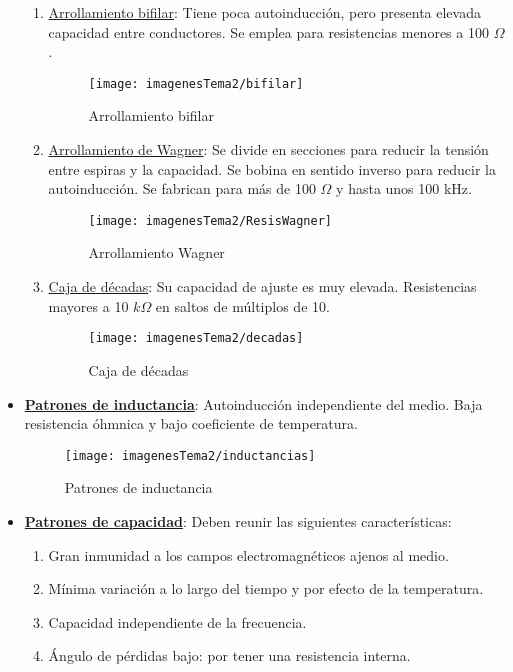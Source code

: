\begin{itemize}
	\begin{enumerate}
		\item \underline{Arrollamiento bifilar}: Tiene poca autoinducción, pero presenta elevada capacidad entre conductores. Se emplea para resistencias menores a 100 $\Omega$.
		
		\begin{figure}[H]
			\centering
			\texttt{[image: imagenesTema2/bifilar]}
			\caption{Arrollamiento bifilar}
			\label{fig:bifilar}
		\end{figure}
		
		\item \underline{Arrollamiento de Wagner}: Se divide en secciones para reducir la tensión entre espiras y la capacidad. Se bobina en sentido inverso para reducir la autoinducción. Se fabrican para más de 100 $\Omega$ y hasta unos 100 kHz.
		
		\begin{figure}[H]
			\centering
			\texttt{[image: imagenesTema2/ResisWagner]}
			\caption{Arrollamiento Wagner}
			\label{fig:resiswagner}
		\end{figure}
		
		\item \underline{Caja de décadas}: Su capacidad de ajuste es muy elevada. Resistencias mayores a 10 $k\Omega$ en saltos de múltiplos de 10.
		\begin{figure}[H]
			\centering
			\texttt{[image: imagenesTema2/decadas]}
			\caption{Caja de décadas}
			\label{fig:decadas}
		\end{figure}
		
		
	\end{enumerate}
	
	\item \underline{\textbf{Patrones de inductancia}}: Autoinducción independiente del medio. Baja resistencia óhmnica  y bajo coeficiente de temperatura.
	
	\begin{figure}[H]
		\centering
		\texttt{[image: imagenesTema2/inductancias]}
		\caption{Patrones de inductancia}
		\label{fig:inductancias}
	\end{figure}
	
	\item \underline{\textbf{Patrones de capacidad}}: Deben reunir las siguientes características: 
	\begin{enumerate}
		\item Gran inmunidad a los campos electromagnéticos ajenos al medio.
		\item Mínima variación a lo largo del tiempo y por efecto de la temperatura.
		\item Capacidad independiente de la frecuencia.
		\item Ángulo de pérdidas bajo: por tener una resistencia interna.
		

\end{enumerate}
\end{itemize}
